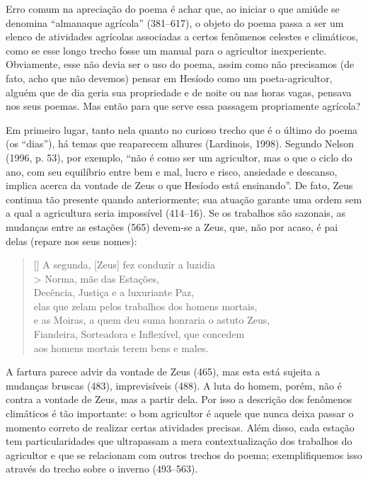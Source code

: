 

Erro comum na apreciação do poema é achar que, ao iniciar o que
amiúde se denomina “almanaque agrícola” (381--617), o objeto do poema
passa a ser um elenco de atividades agrícolas associadas a certos
fenômenos celestes e climáticos, como se esse longo trecho fosse um
manual para o agricultor inexperiente. Obviamente, esse não devia ser o
uso do poema, assim como não precisamos (de fato, acho que não devemos)
pensar em Hesíodo como um poeta-agricultor, alguém que de dia geria sua
propriedade e de noite ou nas horas vagas, pensava nos seus poemas. 
Mas então para que serve essa passagem propriamente agrícola?

Em primeiro lugar, tanto nela quanto no curioso trecho que é o
último do poema (os “dias”), há temas que reaparecem alhures
(Lardinois, 1998). Segundo Nelson (1996, p. 53), por exemplo,
“não é como ser um agricultor, mas o que o ciclo do ano, com seu
equilíbrio entre bem e mal, lucro e risco, ansiedade e descanso,
implica acerca da vontade de Zeus o que Hesíodo está ensinando”. De
fato, Zeus continua tão presente quando anteriormente; sua atuação
garante uma ordem sem a qual a agricultura seria impossível (414--16).
Se os trabalhos são sazonais, as mudanças entre as estações (565)
devem-se a Zeus, que, não por acaso, é pai delas (repare nos seus
nomes):


\begin{verse}[\versewidth]
  A segunda, [Zeus] fez conduzir a luzidia\\> Norma, mãe das Estações,\\
  Decência, Justiça e a luxuriante Paz,\\
  elas que zelam pelos trabalhos dos homens mortais,\\
  e as Moiras, a quem deu suma honraria o astuto Zeus,\\
  Fiandeira, Sorteadora e Inflexível, que concedem\\
  aos homens mortais terem bens e males.
\end{verse}


A fartura parece advir da vontade de Zeus (465), mas esta está sujeita a
mudanças bruscas (483), imprevisíveis (488). A luta do homem, porém,
não é contra a vontade de Zeus, mas a partir dela. Por isso a descrição
dos fenômenos climáticos é tão importante: o bom agricultor é aquele
que nunca deixa passar o momento correto de realizar certas atividades
precisas. Além disso, cada estação tem particularidades que ultrapassam
a mera contextualização dos trabalhos do agricultor e que se relacionam
com outros trechos do poema; exemplifiquemos isso através do trecho
sobre o inverno (493--563).

